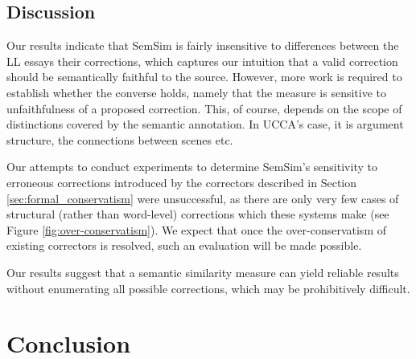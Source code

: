 \documentclass[letter,11pt]{article}
\newcommand{\lc}[1]{\footnote{\color{green}LC: #1}}
\begin{document}
{%
\subsection{Discussion}


Our results indicate that {\sc SemSim} is fairly insensitive to differences between the LL essays their corrections, which
captures our intuition that a valid correction should be semantically faithful to the source.
However, more work is required to establish whether the converse holds, namely that the measure is sensitive
to unfaithfulness of a proposed correction.
This, of course, depends on the scope of distinctions covered by the semantic annotation.
In UCCA's case, it is argument structure, the connections between scenes etc.

Our attempts to conduct experiments to determine {\sc SemSim}'s sensitivity to erroneous
corrections introduced by the correctors described in Section \ref{sec:formal_conservatism} were
unsuccessful, as there are only very few cases of structural (rather than word-level)
corrections which these systems make (see Figure \ref{fig:over-conservatism}).
We expect that once the over-conservatism of existing correctors is resolved,
such an evaluation will be made possible.



Our results suggest that a semantic similarity measure can yield reliable results
without enumerating all possible corrections, which may be prohibitively difficult.



\section{Conclusion}

}
\end{document}
